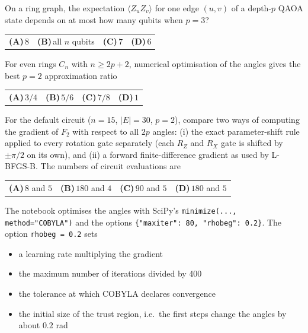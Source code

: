 \documentclass[11pt,a4paper]{article}
\newcommand{\optlabel}[1]{\textbf{(#1)}}
\newenvironment{qitem}[1]{\begin{list}{}{\setlength{\leftmargin}{3.3em}\setlength{\labelwidth}{3.1em}%
  \setlength{\labelsep}{0.2em}\setlength{\topsep}{3pt}\setlength{\parsep}{3pt}}\item[\textbf{Q.#1}\hfill]}{\end{list}}
\newcommand{\qsep}{\par\vspace{2pt}{\color{black!15}\hrule}\vspace{4pt}}
\begin{document}
\begin{qitem}{61}
On a ring graph, the expectation $\langle Z_uZ_v\rangle$ for one edge $(u, v)$ of a depth-$p$ QAOA state depends on at most how
many qubits when $p = 3$?
\par\smallskip\noindent\begin{tabularx}{\linewidth}{@{}*{4}{L}@{}}
\optlabel{A}\,$8$ & \optlabel{B}\,all $n$ qubits & \optlabel{C}\,$7$ & \optlabel{D}\,$6$
\end{tabularx}
\end{qitem}
\qsep

\begin{qitem}{62}
For even rings $C_n$ with $n \ge 2p + 2$, numerical optimisation of the angles gives the best $p = 2$ approximation ratio
\par\smallskip\noindent\begin{tabularx}{\linewidth}{@{}*{4}{L}@{}}
\optlabel{A}\,$3/4$ & \optlabel{B}\,$5/6$ & \optlabel{C}\,$7/8$ & \optlabel{D}\,$1$
\end{tabularx}
\end{qitem}
\qsep

\begin{qitem}{63}
For the default circuit ($n = 15$, $|E| = 30$, $p = 2$), compare two ways of computing the gradient of $F_2$ with respect to
all $2p$ angles: (i) the exact parameter-shift rule applied to every rotation gate separately (each $R_Z$ and $R_X$ gate is shifted
by $\pm\pi/2$ on its own), and (ii) a forward finite-difference gradient as used by L-BFGS-B. The numbers of circuit evaluations are
\par\smallskip\noindent\begin{tabularx}{\linewidth}{@{}*{4}{L}@{}}
\optlabel{A}\,$8$ and $5$ & \optlabel{B}\,$180$ and $4$ & \optlabel{C}\,$90$ and $5$ & \optlabel{D}\,$180$ and $5$
\end{tabularx}
\end{qitem}
\qsep

\begin{qitem}{64}
The notebook optimises the angles with SciPy's \texttt{minimize(..., method="COBYLA")} and the options
\texttt{\{"maxiter": 80, "rhobeg": 0.2\}}. The option \texttt{rhobeg = 0.2} sets
\begin{itemize}[leftmargin=2.6em, labelsep=0.4em, itemsep=2pt, topsep=3pt]
\item[\optlabel{A}] a learning rate multiplying the gradient
\item[\optlabel{B}] the maximum number of iterations divided by 400
\item[\optlabel{C}] the tolerance at which COBYLA declares convergence
\item[\optlabel{D}] the initial size of the trust region, i.e.\ the first steps change the angles by about $0.2$ rad
\end{itemize}
\end{qitem}
\qsep
\end{document}
